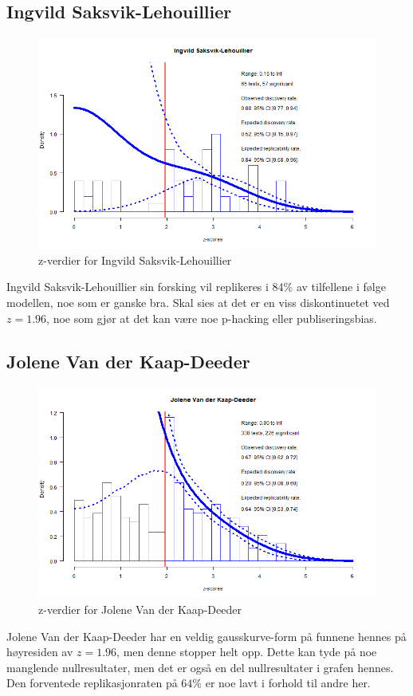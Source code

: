\documentclass[doc,norsk]{apa7}
\begin{document}
\subsection{Ingvild Saksvik-Lehouillier}
\begin{figure}[h!]
    \centering
    \includegraphics[width=\textwidth]{images/Ingvild Saksvik-Lehouillier.png}
    \caption{z-verdier for Ingvild Saksvik-Lehouillier}
\end{figure}
Ingvild Saksvik-Lehouillier sin forsking vil replikeres i 84\% av tilfellene i følge modellen, noe som er ganske bra. Skal sies at det er en viss diskontinuetet ved $z=1.96$, noe som gjør at det kan være noe p-hacking eller publiseringsbias.

\subsection{Jolene Van der Kaap-Deeder}
\begin{figure}[h!]
    \centering
    \includegraphics[width=\textwidth]{images/Jolene Van der Kaap-Deeder.png}
    \caption{z-verdier for Jolene Van der Kaap-Deeder}
\end{figure}
Jolene Van der Kaap-Deeder har en veldig gausskurve-form på funnene hennes på høyresiden av $z=1.96$, men denne stopper helt opp. Dette kan tyde på noe manglende nullresultater, men det er også en del nullresultater i grafen hennes. Den forventede replikasjonraten på $64\%$ er noe lavt i forhold til andre her.
\end{document}
